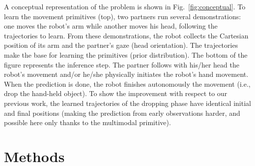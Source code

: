 \documentclass[runningheads,a4paper]{llncs}
\begin{document}
A conceptual representation of the problem is shown in Fig.~\ref{fig:conceptual}.
To learn the movement primitives (top), two partners run several demonstrations: one moves the robot's arm while another moves his head, following the trajectories to learn.
From these demonstrations, the robot collects the Cartesian position of its arm
and the partner's gaze (head orientation). The 
trajectories make the base for learning the  
primitives (prior distribution).
The bottom of the figure represents the inference step. The partner follows with his/her head the robot's movement and/or he/she physically initiates the robot's hand movement. When the prediction is done, the robot finishes autonomously the movement (i.e., drop the hand-held object).
To show the improvement with respect to our previous work, the learned trajectories of the dropping phase have identical initial and final positions (making the prediction from early observations harder, and possible here only thanks to the multimodal primitive).

\section{Methods}
\end{document}
